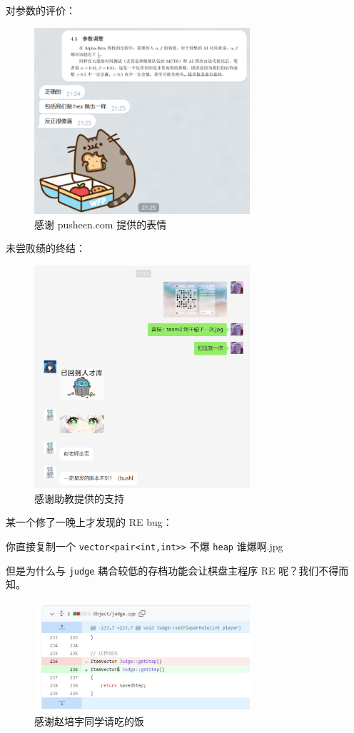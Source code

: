 \documentclass{noithesis}
\begin{document}
	对参数的评价：
	
	\begin{figure}[!htb]
		
		\centering
		\includegraphics[width=8cm]{img/ps2.png}
		
		\caption{感谢 pusheen.com 提供的表情}
	\end{figure}
	
	\newpage
	未尝败绩的终结：
	
	\begin{figure}[!htb]
		
		\centering
		\includegraphics[width=8cm]{img/ps3.png}
		
		\caption{感谢助教提供的支持}
	\end{figure}

	某一个修了一晚上才发现的 RE bug：
	
	你直接复制一个 \verb|vector<pair<int,int>>| 不爆 \verb|heap| 谁爆啊.jpg
	
	但是为什么与 \verb|judge| 耦合较低的存档功能会让棋盘主程序 RE 呢？我们不得而知。
	
	\begin{figure}[!htb]
	
	\centering
	\includegraphics[width=8cm]{img/ps4.png}
	
	\caption{感谢赵培宇同学请吃的饭}
	\end{figure}
\end{document}
